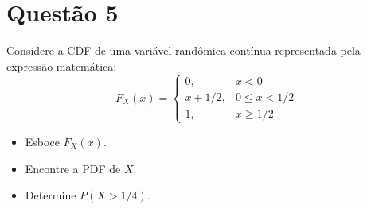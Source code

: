 \section{Questão 5}
Considere a CDF de uma variável randômica contínua representada pela expressão matemática:
%
\begin{equation*}
    F_X(x) = 
    \begin{cases}
        0,     & x < 0 \\
        x + 1/2, & 0 \leq x < 1/2 \\
        1,     & x \geq 1/2
    \end{cases}
\end{equation*}

\begin{itemize}
    \item [a)] Esboce $F_X(x)$.
    \item [b)] Encontre a PDF de $X$.
    \item [c)] Determine $P(X > 1/4)$.
\end{itemize}

